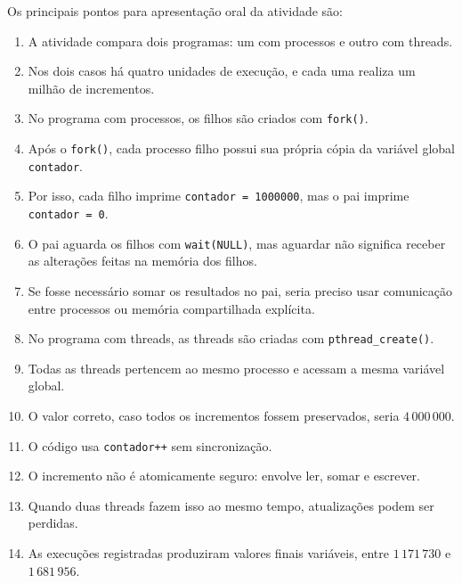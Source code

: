 Os principais pontos para apresentação oral da atividade são:

\begin{enumerate}
    \item A atividade compara dois programas: um com processos e outro com threads.

    \item Nos dois casos há quatro unidades de execução, e cada uma realiza um milhão de incrementos.

    \item No programa com processos, os filhos são criados com \texttt{fork()}.

    \item Após o \texttt{fork()}, cada processo filho possui sua própria cópia da variável global \texttt{contador}.

    \item Por isso, cada filho imprime \texttt{contador = 1000000}, mas o pai imprime \texttt{contador = 0}.

    \item O pai aguarda os filhos com \texttt{wait(NULL)}, mas aguardar não significa receber as alterações feitas na memória dos filhos.

    \item Se fosse necessário somar os resultados no pai, seria preciso usar comunicação entre processos ou memória compartilhada explícita.

    \item No programa com threads, as threads são criadas com \texttt{pthread\_create()}.

    \item Todas as threads pertencem ao mesmo processo e acessam a mesma variável global.

    \item O valor correto, caso todos os incrementos fossem preservados, seria \(4\,000\,000\).

    \item O código usa \texttt{contador++} sem sincronização.

    \item O incremento não é atomicamente seguro: envolve ler, somar e escrever.

    \item Quando duas threads fazem isso ao mesmo tempo, atualizações podem ser perdidas.

    \item As execuções registradas produziram valores finais variáveis, entre \(1\,171\,730\) e \(1\,681\,956\).


\end{enumerate}
